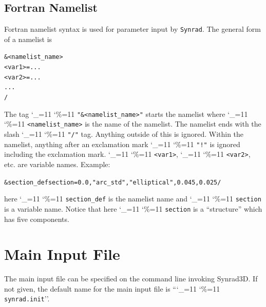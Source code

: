 \documentclass[11pt]{article}
\newcommand{\syn}{\texttt{Synrad}\xspace}
\newcommand\ttcmd{\begingroup\catcode`\_=11 \catcode`\%=11 \dottcmd}
\newcommand\dottcmd[1]{\texttt{#1}\endgroup}
\newcommand{\vn}{\ttcmd}
\newenvironment{example}
  {\vspace{-3.0ex} \begin{alltt}}
  {\end{alltt} \vspace{-2.5ex}}
\begin{document}
\subsection{Fortran Namelist}
\label{s:namelist}

Fortran namelist syntax is used for parameter input by \syn. The
general form of a namelist is
\begin{example}
  &<namelist_name>
    <var1> = ...
    <var2> = ...
    ...
  /
\end{example}
The tag \vn{"\&<namelist_name>"} starts the namelist where
\vn{<namelist_name>} is the name of the namelist. The namelist ends
with the slash \vn{"/"} tag. Anything outside of this is
ignored. Within the namelist, anything after an exclamation mark
\vn{"!"} is ignored including the exclamation mark. \vn{<var1>},
\vn{<var2>}, etc. are variable names. Example:
\begin{example}
  &section_def section =   0.0, "arc_std", "elliptical", 0.045, 0.025 /
\end{example}
here \vn{section_def} is the namelist name and \vn{section} is a variable
name.  Notice that here \vn{section} is a ``structure'' which has five
components.

\section{Main Input File} 

The main input file can be specified on the command line invoking Synrad3D.
If not given, the default name for the main input file is ``\vn{synrad.init}''.
\end{document}
